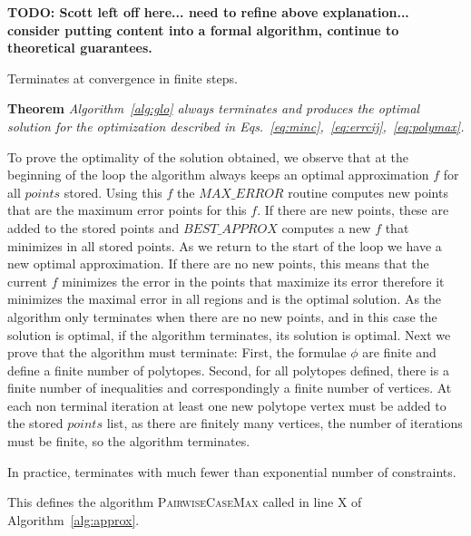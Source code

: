 {\bf TODO: Scott left off here... need to refine above explanation... consider putting content into a formal algorithm, continue to theoretical guarantees.}

Terminates at convergence in finite steps.


{\bf Theorem} {\it Algorithm~\ref{alg:glo} always terminates and produces the optimal solution for the optimization described in Eqs.~\ref{eq:minc},~\ref{eq:errcij},~\ref{eq:polymax}.} 

To prove the optimality of the solution obtained, we observe that at the beginning of the loop the algorithm always keeps an optimal approximation $f$ for all $points$ stored. Using this $f$ the $MAX\_ERROR$ routine computes new points that are the maximum error points for this $f$. If there are new points, these are added to the stored points and $BEST\_APPROX$ computes a new $f$ that minimizes in all stored points. As we return to the start of the loop we have a new optimal approximation. If there are no new points, this means that the current $f$ minimizes the error in the points that maximize its error therefore it minimizes the maximal error in all regions and is the optimal solution.  As the algorithm only terminates when there are no new points, and in this case the solution is optimal, if the algorithm terminates, its solution is optimal.
 Next we prove that the algorithm must terminate: First, the formulae $\phi$  are finite and define a finite number of polytopes. Second, for all polytopes defined, there is a finite number of inequalities and correspondingly a finite number of vertices. At each non terminal iteration at least one new polytope vertex must be added to the stored $points$ list, as there are finitely many vertices, the number of iterations must be finite, so the algorithm terminates.


In practice, terminates with much fewer than exponential number of constraints.

This defines the algorithm \textsc{PairwiseCaseMax} called in line X of Algorithm~\ref{alg:approx}.

